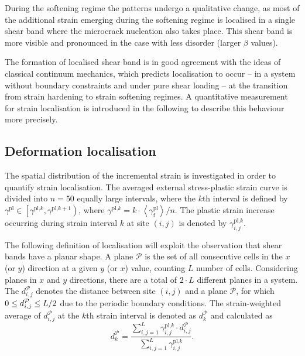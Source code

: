 During the softening regime the patterns undergo a qualitative change, as most of the additional strain emerging during the softening regime is localised in a single shear band where the microcrack nucleation also takes place. This shear band is more visible and pronounced in the case with less disorder (larger $\beta$ values).

The formation of localised shear band is in good agreement with the ideas of classical continuum mechanics, which predicts localisation to occur -- in a system without boundary constraints and under pure shear loading -- at the transition from strain hardening to strain softening regimes. A quantitative measurement for strain localisation is introduced in the following to describe this behaviour more precisely.

\subsection{Deformation localisation}
The spatial distribution of the incremental strain is investigated in order to quantify strain localisation. The averaged external stress-plastic strain curve is divided into $n=50$ equally large intervals, where the $k$th interval is defined by ${\gamma ^{{\text{pl}}}} \in \left[ {{\gamma ^{{\text{pl}}{\text{,}}k}},{\gamma ^{{\text{pl}}{\text{,}}k + 1}}} \right)$, where ${\gamma ^{{\text{pl}}{\text{,}}k}} = k \cdot \left\langle {\gamma _{\text{f}}^{{\text{pl}}}} \right\rangle /n$. The plastic strain increase occurring during strain interval $k$ at site $\left( {i,j} \right)$ is denoted by $\gamma _{i,j}^{{\text{pl}}{\text{,}}k}$.

The following definition of localisation will exploit the observation that shear bands have a planar shape. A plane ${\mathcal{P}}$ is the set of all consecutive cells in the $x$ (or $y$) direction at a given $y$ (or $x$) value, counting $L$ number of cells. Considering planes in $x$ and $y$ directions, there are a total of $2 \cdot L$ different planes in a system. The $d_{i,j}^\mathcal{P}$ denotes the distance between site $\left( {i,j} \right)$ and a plane $\mathcal{P}$, for which $0 \le d_{i,j}^{\cal P} \le L/2$ due to the periodic boundary conditions. The strain-weighted average of $d_{i,j}^\mathcal{P}$ at the $k$th strain interval is denoted as $d_k^\mathcal{P}$ and calculated as 
\begin{equation}
d_k^\mathcal{P} = \frac{{\sum\limits_{i,j = 1}^L {\gamma _{i,j}^{{\text{pl,}}k} \cdot d_{i,j}^\mathcal{P}} }}{{\sum\limits_{i,j = 1}^L {\gamma _{i,j}^{{\text{pl,}}k}} }}.
\end{equation}

